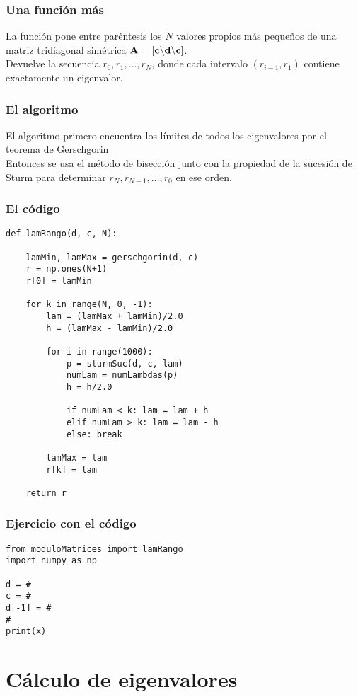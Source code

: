 \documentclass[12pt]{beamer}
\begin{document}
\begin{frame}
\frametitle{Una función más}
La función  pone entre paréntesis los $N$ valores propios más pequeños de una matriz tridiagonal simétrica $\vb{A} = [ \vb{c} \backslash \vb{d} \backslash \vb{c}]$.
\\
\bigskip
\pause
Devuelve la secuencia $r_{0}, r_{1}, \ldots, r_{N}$, donde cada intervalo $(r_{i-1}, r_{1})$ contiene exactamente un eigenvalor.
\end{frame}
\begin{frame}
\frametitle{El algoritmo}
El algoritmo primero encuentra los límites de todos los eigenvalores por el teorema de Gerschgorin
\\
\bigskip
\pause
Entonces se usa el método de bisección junto con la propiedad de la sucesión de Sturm para determinar $r_{N}, r_{N-1}, \ldots, r_{0}$ en ese orden.
\end{frame}
\begin{frame}
\frametitle{El código}
\begin{lstlisting}[caption=Código para poner en paréntesis los eigenvalores]
def lamRango(d, c, N):
    
    lamMin, lamMax = gerschgorin(d, c)
    r = np.ones(N+1)
    r[0] = lamMin
    
    for k in range(N, 0, -1):
        lam = (lamMax + lamMin)/2.0
        h = (lamMax - lamMin)/2.0
        
        for i in range(1000):
            p = sturmSuc(d, c, lam)
            numLam = numLambdas(p)
            h = h/2.0
            
            if numLam < k: lam = lam + h
            elif numLam > k: lam = lam - h
            else: break
        
        lamMax = lam
        r[k] = lam
    
    return r
\end{lstlisting}
\end{frame}
\begin{frame}[fragile]
\frametitle{Ejercicio con el código}
\begin{lstlisting}[caption=Parte del código para resolver el ejercicio]
from moduloMatrices import lamRango
import numpy as np

d = #
c = #
d[-1] = #
#
print(x)
\end{lstlisting}
\end{frame}


\section{Cálculo de eigenvalores}
\end{document}
